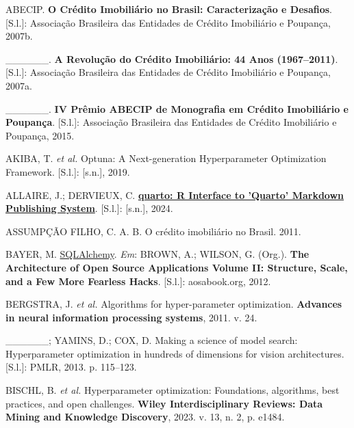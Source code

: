 \documentclass[
  12pt,
  a4paper,
]{scrreprt}
\newlength{\cslhangindent}
\newenvironment{CSLReferences}[2] %
 {\begin{list}{}{%
  \setlength{\itemindent}{0pt}
  \setlength{\leftmargin}{0pt}
  \setlength{\parsep}{0pt}
  \ifodd #1
   \setlength{\leftmargin}{\cslhangindent}
   \setlength{\itemindent}{-1\cslhangindent}
  \fi
  \setlength{\itemsep}{#2\baselineskip}}}
 {\end{list}}
\begin{document}
\label{refs}
\begin{CSLReferences}{0}{1}
ABECIP. \textbf{O Crédito Imobiliário no Brasil: Caracterização e
Desafios}. {[}S.l.{]}: Associação Brasileira das Entidades de Crédito
Imobiliário e Poupança, 2007b.

\_\_\_\_\_\_. \textbf{A Revolução do Crédito Imobiliário: 44 Anos
(1967--2011)}. {[}S.l.{]}: Associação Brasileira das Entidades de
Crédito Imobiliário e Poupança, 2007a.

\_\_\_\_\_\_. \textbf{IV Prêmio ABECIP de Monografia em Crédito
Imobiliário e Poupança}. {[}S.l.{]}: Associação Brasileira das Entidades
de Crédito Imobiliário e Poupança, 2015.

AKIBA, T. \emph{et al.} Optuna: A Next-generation Hyperparameter
Optimization Framework. {[}S.l.{]}: {[}s.n.{]}, 2019.

ALLAIRE, J.; DERVIEUX, C.
\textbf{\href{https://CRAN.R-project.org/package=quarto}{quarto: R
Interface to 'Quarto' Markdown Publishing System}}. {[}S.l.{]}:
{[}s.n.{]}, 2024.

ASSUMPÇÃO FILHO, C. A. B. O cr{é}dito imobili{á}rio no Brasil. 2011.

BAYER, M. \href{http://aosabook.org/en/sqlalchemy.html}{SQLAlchemy}.
\emph{Em}: BROWN, A.; WILSON, G. (Org.). \textbf{The Architecture of
Open Source Applications Volume II: Structure, Scale, and a Few More
Fearless Hacks}. {[}S.l.{]}: aosabook.org, 2012.

BERGSTRA, J. \emph{et al.} Algorithms for hyper-parameter optimization.
\textbf{Advances in neural information processing systems}, 2011. v. 24.

\_\_\_\_\_\_; YAMINS, D.; COX, D. Making a science of model search:
Hyperparameter optimization in hundreds of dimensions for vision
architectures. {[}S.l.{]}: PMLR, 2013. p. 115--123.

BISCHL, B. \emph{et al.} Hyperparameter optimization: Foundations,
algorithms, best practices, and open challenges. \textbf{Wiley
Interdisciplinary Reviews: Data Mining and Knowledge Discovery}, 2023.
v. 13, n. 2, p. e1484.


\end{CSLReferences}
\end{document}
